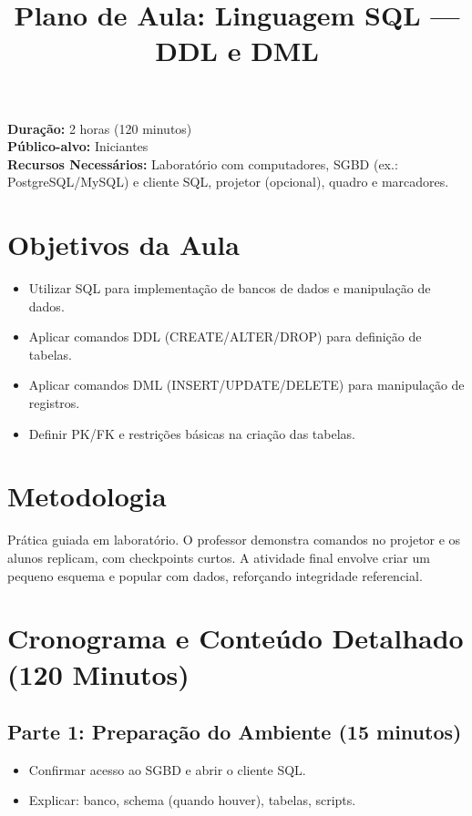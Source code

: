 \documentclass[12pt,a4paper]{article}
\title{Plano de Aula: Linguagem SQL --- DDL e DML}
\date{}
\begin{document}
\maketitle

\noindent
\textbf{Duração:} 2 horas (120 minutos)\\
\textbf{Público-alvo:} Iniciantes\\
\textbf{Recursos Necessários:} Laboratório com computadores, SGBD (ex.: PostgreSQL/MySQL) e cliente SQL, projetor (opcional), quadro e marcadores.

\section{Objetivos da Aula}
\begin{itemize}[leftmargin=*,itemsep=0.25em]
  \item Utilizar SQL para implementação de bancos de dados e manipulação de dados.
  \item Aplicar comandos DDL (CREATE/ALTER/DROP) para definição de tabelas.
  \item Aplicar comandos DML (INSERT/UPDATE/DELETE) para manipulação de registros.
  \item Definir PK/FK e restrições básicas na criação das tabelas.
\end{itemize}

\section{Metodologia}
Prática guiada em laboratório. O professor demonstra comandos no projetor e os alunos replicam, com checkpoints curtos. A atividade final envolve criar um pequeno esquema e popular com dados, reforçando integridade referencial.

\section{Cronograma e Conteúdo Detalhado (120 Minutos)}
\subsection*{Parte 1: Preparação do Ambiente (15 minutos)}
\begin{itemize}[leftmargin=*,itemsep=0.35em]
  \item Confirmar acesso ao SGBD e abrir o cliente SQL.
  \item Explicar: banco, schema (quando houver), tabelas, scripts.
\end{itemize}
\end{document}
